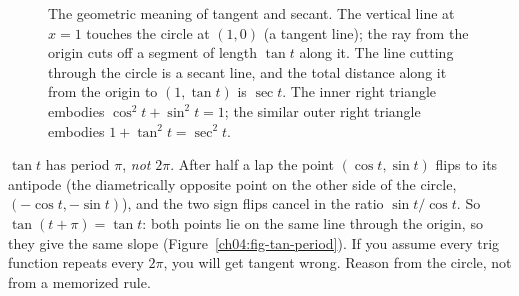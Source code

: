 \begin{figure}[htbp]
\centering
{}
\caption{The geometric meaning of tangent and secant. The vertical line at $x=1$ touches the circle at $(1,0)$ (a tangent line); the ray from the origin cuts off a segment of length $\tan t$ along it. The line cutting through the circle is a secant line, and the total distance along it from the origin to $(1,\tan t)$ is $\sec t$. The inner right triangle embodies $\cos^2 t + \sin^2 t = 1$; the similar outer right triangle embodies $1 + \tan^2 t = \sec^2 t$.}
\label{ch04:fig-tangent-secant}
\end{figure}

\begin{trapbox}
$\tan t$ has period $\pi$, \emph{not} $2\pi$. After half a lap the point $(\cos t,\sin t)$ flips to its antipode (the diametrically opposite point on the other side of the circle, $(-\cos t, -\sin t)$), and the two sign flips cancel in the ratio $\sin t/\cos t$. So $\tan(t+\pi) = \tan t$: both points lie on the same line through the origin, so they give the same slope (Figure~\ref{ch04:fig-tan-period}). If you assume every trig function repeats every $2\pi$, you will get tangent wrong. Reason from the circle, not from a memorized rule.
\end{trapbox}

